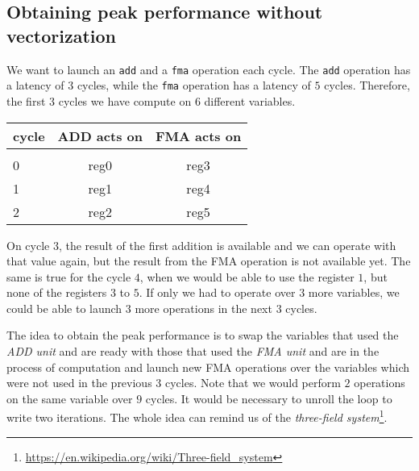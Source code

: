 \documentclass[
    12pt, %
]{fphw}
\newcommand{\tech}{\texttt}
\begin{document}
\subsection{Obtaining peak performance without vectorization}

    We want to launch an \tech{add} and a \tech{fma} operation each cycle.
The \tech{add} operation has a latency of $3$ cycles,
while the \tech{fma} operation has a latency of $5$ cycles.
Therefore, the first $3$ cycles we have compute on $6$ different variables.

\begin{center}
    \begin{tabular}{l||c c}
        cycle & ADD acts on & FMA acts on \\
        \hline \hline \\
        0 & reg0 & reg3 \\
        1 & reg1 & reg4 \\
        2 & reg2 & reg5 \\
    \end{tabular}
\end{center}

\noindent
On cycle $3$, the result of the first addition is available
and we can operate with that value again,
but the result from the FMA operation is not available yet.
The same is true for the cycle $4$, when we would be able to use the register $1$,
but none of the registers $3$ to $5$.
If only we had to operate over $3$ more variables,
we could be able to launch $3$ more operations in the next $3$ cycles.

    The idea to obtain the peak performance is
to swap the variables that used the \textit{ADD unit} and are ready
with those that used the \textit{FMA unit} and are in the process of computation and
launch new FMA operations over the variables which were not used
in the previous $3$ cycles.
Note that we would perform $2$ operations on the same variable over $9$ cycles.
It would be necessary to unroll the loop to write two iterations.
The whole idea can remind us of the \textit{three-field system}\footnote{
\url{https://en.wikipedia.org/wiki/Three-field_system}
}.
\end{document}
